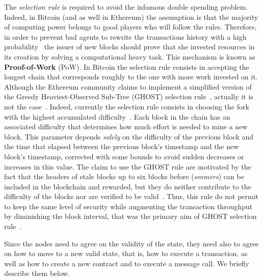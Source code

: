 The \emph{selection rule} is required to avoid the infamous double spending
problem. Indeed, in Bitcoin (and as well in Ethereum) the assumption is that the
majority of computing power belongs to good players who will follow the
rules. Therefore, in order to prevent bad agents
to rewrite the transactions history with a high probability~\cite{bib:bitcoin}
the issuer of new blocks should prove that she invested resources in its
creation
by solving a computational heavy task. This mechanism is known as
\textbf{Proof-of-Work} (PoW). In Bitcoin the selection rule consists in
accepting the longest chain that corresponds roughly to the one with more work
invested on it.
Although the Ethereum community claims to implement a simplified version of
the Greedy Heaviest-Observed Sub-Tree (GHOST) selection
rule~\cite{wood2018ethereum}, actually it is not the
case~\cite{bib:securityAndScalabilityPoW}.
Indeed, currently the selection rule consists in choosing the fork with the
highest accumulated difficulty~\cite{wood2018ethereum}. Each block in the
chain has an associated difficulty that determines how much effort is needed to
mine a new block. This parameter depends \emph{solely} on the difficulty of
the previous block and the time that elapsed between the previous block's 
timestamp and the new block's timestamp, corrected with some bounds to avoid 
sudden decreases or increases in this value. The claim to use the GHOST rule
are motivated by the fact that the headers of stale blocks up to six blocks
before 
(\emph{ommers}) can be included in the blockchain and rewarded, 
but they do neither contribute
to the difficulty of the blocks nor are verified to be 
valid~\cite{bib:securityAndScalabilityPoW}.
Thus, this rule do not permit to keep the same
level of security while augmenting the transaction throughput by diminishing
the block interval, that was the primary aim of GHOST selection
rule~\cite{bib:ghost}.


Since the nodes need to agree on the validity of the state, they need also to
agree on how to move to a new valid state, that is, how to execute a
transaction, as well as how to create a new contract and to execute a message
call. We briefly describe them below.


